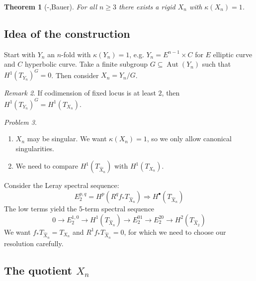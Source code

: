 \documentclass[A4paper, british]{amsart}
\theoremstyle{darkgreentheorem}
\newtheorem{thm}{Theorem}[section]
\theoremstyle{darkbluedefinition}
\theoremstyle{darkredexample}
\theoremstyle{remark}
\newtheorem{rem}[thm]{Remark}
\newtheorem{pbl}[thm]{Problem}
\DeclareMathOperator{\Aut}{Aut}
\newcommand{\1}{\mathbbm{1}}
\newcommand{\grd}{^{\bullet}}
\newcommand{\tms}{\times}
\newcommand{\sub}{\subseteq}
\begin{document}
\begin{thm}[-,Bauer]
    For all $n\geqslant 3$ there exists a rigid $X_{n}$ with $\kappa(X_{n})=1$.
\end{thm}

\subsection{Idea of the construction}

Start with $Y_{n}$ an $n$-fold with $\kappa(Y_{n})=1$, e.g. $Y_{n}=E^{n-1}\tms C$ for $E$ elliptic curve and $C$ hyperbolic curve.
Take a finite subgroup $G\sub \Aut(Y_{n})$ such that $H^{1}(T_{Y_{n}})^{G}=0$.
Then consider $X_{n}=Y_{n}/G$.

\begin{rem}
    If codimension of fixed locus is at least $2$, then $H^{1}(T_{Y_{n}})^{G}=H^{1}(T_{X_{n}})$.
\end{rem}

\begin{pbl}
    \begin{enumerate}[label=\alph*)]
	\item $X_{n}$ may be singular.
	    We want $\kappa(X_{n})=1$, so we only allow canonical singularities.
	\item We need to compare $H^{1}(T_{\hat{X}_{n}})$ with $H^{1}(T_{X_{n}})$.
    \end{enumerate}
\end{pbl}

Consider the Leray spectral sequence:
\[ E_{2}^{p,q}=H^{p}(R^{q}f_{*}T_{\hat{X}_{n}})\Rightarrow H\grd(T_{\hat{X}_{n}}) \]
The low terms yield the 5-term spectral sequence
\[ 0\to E_{2}^{1,0}\to H^{1}(T_{\hat{X}_{n}})\to E_{2}^{01}\to E_{2}^{20}\to H^{2}(T_{\hat{X}_{2}}) \]
We want $f_{*}T_{\hat{X}_{n}}=T_{X_{n}}$ and $R^{1}f_{*}T_{\hat{X}_{n}}=0$, for which we need to choose our resolution carefully.

\subsection{The quotient $X_{n}$}
\end{document}
